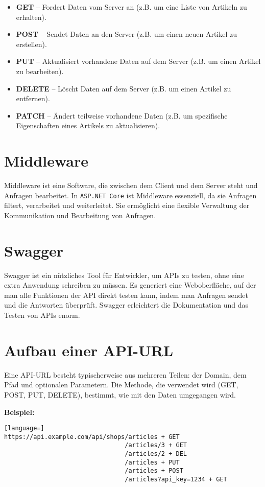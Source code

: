 \documentclass[a4paper,12pt]{report}
\begin{document}
\begin{itemize}
    \item \textbf{GET} – Fordert Daten vom Server an (z.B. um eine Liste von Artikeln zu erhalten).
    \item \textbf{POST} – Sendet Daten an den Server (z.B. um einen neuen Artikel zu erstellen).
    \item \textbf{PUT} – Aktualisiert vorhandene Daten auf dem Server (z.B. um einen Artikel zu bearbeiten).
    \item \textbf{DELETE} – Löscht Daten auf dem Server (z.B. um einen Artikel zu entfernen).
    \item \textbf{PATCH} – Ändert teilweise vorhandene Daten (z.B. um spezifische Eigenschaften eines Artikels zu aktualisieren).
\end{itemize}

\section{Middleware}
Middleware ist eine Software, die zwischen dem Client und dem Server steht und Anfragen bearbeitet. In \texttt{ASP.NET Core} ist Middleware essenziell, da sie Anfragen filtert, verarbeitet und weiterleitet. Sie ermöglicht eine flexible Verwaltung der Kommunikation und Bearbeitung von Anfragen.

\section{Swagger}
Swagger ist ein nützliches Tool für Entwickler, um APIs zu testen, ohne eine extra Anwendung schreiben zu müssen. Es generiert eine Weboberfläche, auf der man alle Funktionen der API direkt testen kann, indem man Anfragen sendet und die Antworten überprüft. Swagger erleichtert die Dokumentation und das Testen von APIs enorm.

\section{Aufbau einer API-URL}
Eine API-URL besteht typischerweise aus mehreren Teilen: der Domain, dem Pfad und optionalen Parametern. Die Methode, die verwendet wird (GET, POST, PUT, DELETE), bestimmt, wie mit den Daten umgegangen wird. 

\textbf{Beispiel:}

\begin{lstlisting}[language=]
https://api.example.com/api/shops/articles + GET
                                 /articles/3 + GET
                                 /articles/2 + DEL
                                 /articles + PUT
                                 /articles + POST
                                 /articles?api_key=1234 + GET
\end{lstlisting}
\end{document}
